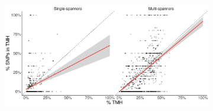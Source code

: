 \clearpage

\thispagestyle{empty}

%
%
\begin{figure}[!htbp]
  \centering

  \begin{subfigure}[t]{\textwidth}
    \centering
    \caption{}
    \includegraphics[width=\linewidth]{ncbi_peregrine_results/fig_f_snps_found_and_expected_per_spanner.png}
    \label{fig:f_snps_found_and_expected_per_spanner}
  \end{subfigure}

  \vfill


\end{figure}
